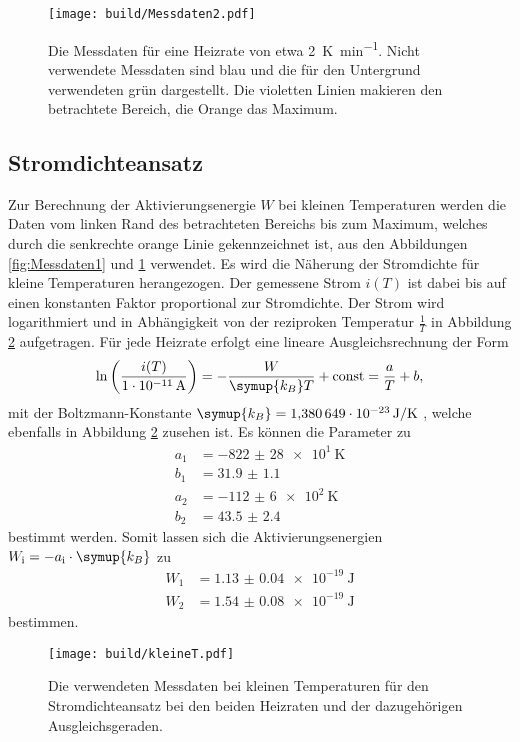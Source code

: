 \begin{figure}[htb]
  \centering
  \texttt{[image: build/Messdaten2.pdf]}
  \caption{Die Messdaten für eine Heizrate von etwa \SI{2}{\kelvin\per\minute}. Nicht verwendete Messdaten sind blau und die für den Untergrund verwendeten grün dargestellt. Die violetten Linien makieren den betrachtete Bereich, die Orange das Maximum.}
  \label{fig:Messdaten2}
\end{figure}
\FloatBarrier

\subsection{Stromdichteansatz}
\label{sec:klT}
Zur Berechnung der Aktivierungsenergie $W$ bei kleinen Temperaturen werden die Daten vom linken Rand des betrachteten Bereichs bis zum Maximum, welches durch die senkrechte orange Linie gekennzeichnet ist,
aus den Abbildungen \ref{fig:Messdaten1} und \ref{fig:Messdaten2} verwendet. Es wird die Näherung der Stromdichte für kleine Temperaturen
herangezogen. Der gemessene Strom $i(T)$ ist dabei bis auf einen konstanten Faktor proportional zur Stromdichte. Der Strom wird logarithmiert
und in Abhängigkeit von der reziproken Temperatur $\frac{1}{T}$ in Abbildung \ref{fig:klT} aufgetragen. Für jede Heizrate erfolgt eine lineare Ausgleichsrechnung der Form
\begin{equation}
    \label{eqn:lin}
    \ln\left(\frac{i(T)}{\SI{1e-11}{\ampere}}\right) = -\frac{W}{\symup{k_B} T} + \text{const} = \frac{a}{T} + b,
\end{equation}
mit der Boltzmann-Konstante $\symup{k_B} = \SI{1.380649e-23}{\joule\per\kelvin}$ \cite{codata}, welche ebenfalls in Abbildung \ref{fig:klT} zusehen ist.
Es können die Parameter zu
\begin{align*}
    a_1 &= \SI{-822(28)e1}{\kelvin} \\
    b_1 &= \num{31.9(11)} \\
    a_2 &= \SI{-112(6)e2}{\kelvin} \\
    b_2 &= \num{43.5(24)}
\end{align*}
bestimmt werden.
Somit lassen sich die Aktivierungsenergien $W_\text{i} = -a_\text{i} \cdot \symup{k_B}$ zu
\begin{align*}
    W_1 &= \SI{1.13(4)e-19}{\joule} \\
    W_2 &= \SI{1.54(8)e-19}{\joule}
\end{align*}
bestimmen.
\begin{figure}[htb]
  \centering
  \texttt{[image: build/kleineT.pdf]}
  \caption{Die verwendeten Messdaten bei kleinen Temperaturen für den Stromdichteansatz bei den beiden Heizraten und der dazugehörigen Ausgleichsgeraden.}
  \label{fig:klT}
\end{figure}
\FloatBarrier


